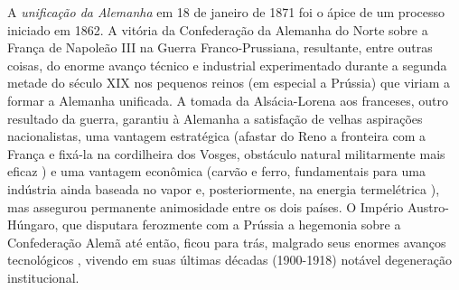 A \textit{unificação da Alemanha} em 18 de janeiro de 1871 foi o ápice de um processo iniciado em 1862. A vitória da Confederação da Alemanha do Norte sobre a França de Napoleão III na Guerra Franco-Prussiana, resultante, entre outras coisas, do enorme avanço técnico e industrial experimentado durante a segunda metade do século XIX nos pequenos reinos (em especial a Prússia) que viriam a formar a Alemanha unificada.  A tomada da Alsácia-Lorena aos franceses, outro resultado da guerra, garantiu à Alemanha a satisfação de velhas aspirações nacionalistas, uma vantagem estratégica (afastar do Reno a fronteira com a França e fixá-la na cordilheira dos Vosges, obstáculo natural militarmente mais eficaz \cite{eckhardt_alsace_1918}) e uma vantagem econômica (carvão e ferro, fundamentais para uma indústria ainda baseada no vapor e, posteriormente, na energia termelétrica \cite{brooks_alsace_1917}), mas assegurou permanente animosidade entre os dois países. O Império Austro-Húngaro, que disputara ferozmente com a Prússia a hegemonia sobre a Confederação Alemã até então, ficou para trás, malgrado seus enormes avanços tecnológicos \cite{schulze_engin_1996}, vivendo em suas últimas décadas (1900-1918) notável degeneração institucional. 

